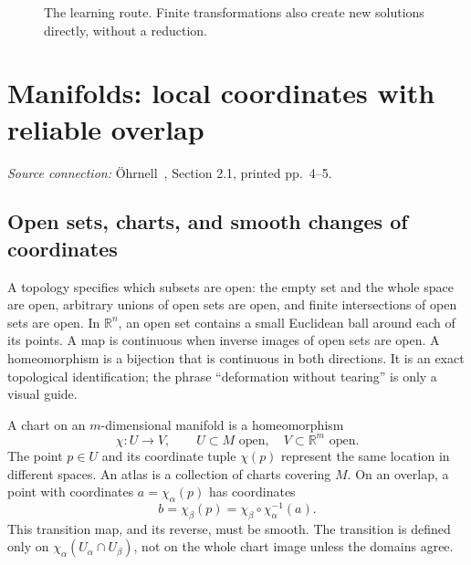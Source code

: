 \documentclass[11pt,a4paper]{article}
\numberwithin{equation}{section}
\theoremstyle{definition}
\theoremstyle{plain}
\theoremstyle{remark}
\newcommand{\R}{\mathbb R}
\newcommand{\source}[1]{\textit{Source connection:} \"Ohrnell~\cite{ohrnell}, #1.}
\begin{document}
\begin{figure}[htbp]\centering
{}
\caption{The learning route. Finite transformations also create new solutions directly, without a reduction.}
\end{figure}

\section{Manifolds: local coordinates with reliable overlap}\label{sec:manifolds}
\source{Section 2.1, printed pp.~4--5}

\subsection{Open sets, charts, and smooth changes of coordinates}
A topology specifies which subsets are open: the empty set and the whole space are open, arbitrary unions of open sets are open, and finite intersections of open sets are open. In $\R^n$, an open set contains a small Euclidean ball around each of its points. A map is continuous when inverse images of open sets are open. A homeomorphism is a bijection that is continuous in both directions. It is an exact topological identification; the phrase ``deformation without tearing'' is only a visual guide.

A chart on an $m$-dimensional manifold is a homeomorphism
\[
\chi:U\longrightarrow V,\qquad U\subset M\text{ open},\quad V\subset\R^m\text{ open}.
\]
The point $p\in U$ and its coordinate tuple $\chi(p)$ represent the same location in different spaces. An atlas is a collection of charts covering $M$. On an overlap, a point with coordinates $a=\chi_\alpha(p)$ has coordinates
\[
b=\chi_\beta(p)=\chi_\beta\circ\chi_\alpha^{-1}(a).
\]
This transition map, and its reverse, must be smooth. The transition is defined only on $\chi_\alpha(U_\alpha\cap U_\beta)$, not on the whole chart image unless the domains agree.
\end{document}
